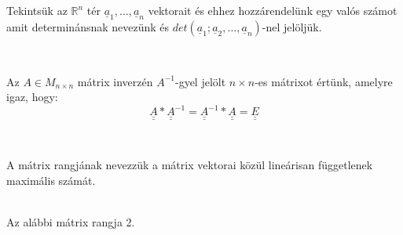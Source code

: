 \documentclass[11pt,a4paper]{article}
\begin{document}
\begin{tcolorbox}[colback=blue!5!white,colframe=blue!70!black,title= 7. Mátrix determináns]
    Tekintsük az \(\mathbb{R}^n\) tér \(\underline{a}_1, ..., \underline{a}_n\) vektorait és ehhez hozzárendelünk egy valós számot amit determinánsnak nevezünk és
\(det(\underline{a}_1; \underline{a}_2,..., \underline{a}_n)\)-nel jelöljük.
\begin{center}
    \\
\end{center}
\end{tcolorbox}
\begin{tcolorbox}[colback=blue!5!white,colframe=blue!70!black,title= 8. Mátrix inverze]
    Az \(A \in M_{n\times n}\) mátrix inverzén \(A^{-1}\)-gyel jelölt \(n \times n\)-es mátrixot értünk, amelyre igaz, hogy:
    $$\underline{\underline{A}} * \underline{\underline{A}}^{-1} = \underline{\underline{A}}^{-1} * \underline{\underline{A}} = \underline{\underline{E}}$$
    \begin{center}
        \\
    \end{center}
\end{tcolorbox}

\begin{tcolorbox}[colback=blue!5!white,colframe=blue!70!black,title= 9. Mátrix rangja]
    A mátrix rangjának nevezzük a mátrix vektorai közül lineárisan függetlenek maximális számát.
    \begin{center}
        \\
        Az alábbi mátrix rangja 2.
    \end{center}
\end{tcolorbox}
\newpage
\end{document}
